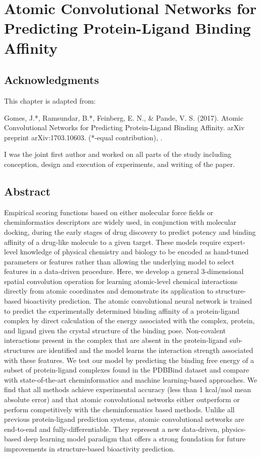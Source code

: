 \section{Atomic Convolutional Networks for Predicting Protein-Ligand Binding Affinity}

\subsection{Acknowledgments}

This chapter is adapted from: 

Gomes, J.*, Ramsundar, B.*, Feinberg, E. N., & Pande, V. S. (2017). Atomic Convolutional Networks for Predicting Protein-Ligand Binding Affinity. arXiv preprint arXiv:1703.10603. (*-equal contribution), \cite{gomes2017atomic}. 


I was the joint first author and worked on all parts of the study including conception, design and execution of experiments, and writing of the paper.


\subsection{Abstract}
Empirical scoring functions based on either molecular force fields or cheminformatics descriptors are widely used, in conjunction with molecular docking, during the early stages of drug discovery to predict potency and binding affinity of a drug-like molecule to a given target.  These models require expert-level knowledge of physical chemistry and biology to be encoded as hand-tuned parameters or features rather than allowing the underlying model to select features in a data-driven procedure.  Here, we develop a general 3-dimensional spatial convolution operation for learning atomic-level chemical interactions directly from atomic coordinates and demonstrate its application to structure-based bioactivity prediction.  The atomic convolutional neural network is trained to predict the experimentally determined binding affinity of a protein-ligand complex by direct calculation of the energy associated with the complex, protein, and ligand given the crystal structure of the binding pose. Non-covalent interactions present in the complex that are absent in the protein-ligand sub-structures are identified and the model learns the interaction strength associated with these features. We test our model by predicting the binding free energy of a subset of protein-ligand complexes found in the PDBBind dataset and compare with state-of-the-art cheminformatics and machine learning-based approaches.  We find that all methods achieve experimental accuracy (less than 1 kcal/mol mean absolute error) and that atomic convolutional networks either outperform or perform competitively with the cheminformatics based methods. Unlike all previous protein-ligand prediction systems, atomic convolutional networks are end-to-end and fully-differentiable.  They represent a new data-driven, physics-based deep learning model paradigm that offers a strong foundation for future improvements in structure-based bioactivity prediction. 

